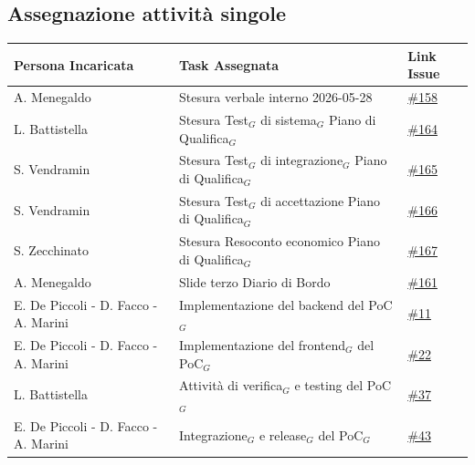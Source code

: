 \documentclass[a4paper, 10pt, colorlinks=true, linkcolor=black, urlcolor=blue, citecolor=blue, hidelinks]{article}
\newcommand{\issueDoc}[1]{\href{https://github.com/thebitless-group-swe/thebitless.github.io/issues/#1}{\##1}}
\newcommand{\issuePoC}[1]{\href{https://github.com/thebitless-group-swe/PoC/issues/#1}{\##1}}
\begin{document}
\subsection{Assegnazione attività singole}
\begin{center}
    \renewcommand{\arraystretch}{1.4}
        \begin{tabular}{|p{4.2cm}|p{6.2cm}|p{2.2cm}|}
        \hline
        \textbf{Persona Incaricata} & \textbf{Task Assegnata} & \centering\textbf{Link Issue} \tabularnewline
        \hline
        A. Menegaldo & Stesura verbale interno 2026-05-28 & \issueDoc{158} \\
        \hline
        L. Battistella & Stesura Test$_G$ di sistema$_G$ Piano di Qualifica$_G$ & \issueDoc{164} \\
        \hline
        S. Vendramin & Stesura Test$_G$ di integrazione$_G$ Piano di Qualifica$_G$ & \issueDoc{165} \\
        \hline
        S. Vendramin & Stesura Test$_G$ di accettazione Piano di Qualifica$_G$ & \issueDoc{166} \\
        \hline
        S. Zecchinato & Stesura Resoconto economico Piano di Qualifica$_G$ & \issueDoc{167} \\
        \hline
        A. Menegaldo & Slide terzo Diario di Bordo & \issueDoc{161} \\
        \hline
        E. De Piccoli - D. Facco - A. Marini & Implementazione del backend del PoC$_G$ & \issuePoC{11} \\
        \hline
        E. De Piccoli - D. Facco - A. Marini & Implementazione del frontend$_G$ del PoC$_G$ & \issuePoC{22} \\
        \hline
        L. Battistella & Attività di verifica$_G$ e testing del PoC$_G$ & \issuePoC{37} \\
        \hline
        E. De Piccoli - D. Facco - A. Marini & Integrazione$_G$ e release$_G$ del PoC$_G$ & \issuePoC{43} \\
        \hline
    \end{tabular}
\end{center}

\appendix
\end{document}
